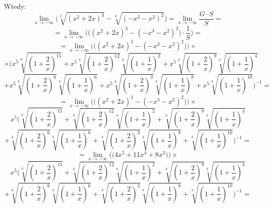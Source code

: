 \documentclass{article}
\begin{document}
Wtedy:
\begin{equation*}
    \lim_{x \to - \infty} \Big(\sqrt[6]{(x^2 + 2x)^{3}} - \sqrt[6]{(-x^3 - x^2)^{2}}\Big) = \lim_{x \to - \infty} \frac{G \cdot S}{S} =
\end{equation*}
\begin{equation*}
    = \lim_{x \to - \infty} \Bigg(\Big((x^2 + 2x)^{3} - (-x^3 - x^2)^{2}\Big) \cdot \frac{1}{S}\Bigg) =
\end{equation*}
\begin{equation*}
    = \lim_{x \to - \infty} \Bigg(\Big((x^2 + 2x)^{3} - (-x^3 - x^2)^{2}\Big)\Bigg) \times %
\end{equation*}
\begin{equation*}
    \times \Bigg(x^{5}\sqrt[6]{(1 + \frac{2}{x})^{15}} + x^{5}\sqrt[6]{(1 + \frac{2}{x})^{12}}\sqrt[6]{(1 + \frac{1}{x})^{2}}  + x^{5}\sqrt[6]{(1 + \frac{2}{x})^{9}}\sqrt[6]{(1 + \frac{1}{x})^{4}}
\end{equation*}
\begin{equation*}
    +  x^{5}\sqrt[6]{(1 + \frac{2}{x})^{6}}\sqrt[6]{(1 + \frac{1}{x})^{6}} + x^{5}\sqrt[6]{(1 + \frac{2}{x})^{3}}\sqrt[6]{(1 + \frac{1}{x})^{8}} + x^{5}\sqrt[6]{(1 + \frac{1}{x})^{10}}\Bigg)^{-1} = 
\end{equation*}
\begin{equation*}
    = \lim_{x \to - \infty} \Bigg(\Big((x^2 + 2x)^{3} - (-x^3 - x^2)^{2}\Big)\Bigg) \times %
\end{equation*}
\begin{equation*}
    x^{5}\Bigg(\sqrt[6]{(1 + \frac{2}{x})^{15}} + \sqrt[6]{(1 + \frac{2}{x})^{12}}\sqrt[6]{(1 + \frac{1}{x})^{2}}  + \sqrt[6]{(1 + \frac{2}{x})^{9}}\sqrt[6]{(1 + \frac{1}{x})^{4}}
\end{equation*}
\begin{equation*}
    +  \sqrt[6]{(1 + \frac{2}{x})^{6}}\sqrt[6]{(1 + \frac{1}{x})^{6}} + \sqrt[6]{(1 + \frac{2}{x})^{3}}\sqrt[6]{(1 + \frac{1}{x})^{8}} + \sqrt[6]{(1 + \frac{1}{x})^{10}}\Bigg)^{-1} = 
\end{equation*}
\begin{equation*}
    = \lim_{x \to - \infty} \Bigg(\Big(4x^5 + 11x^4 + 8x^3\Big)\Bigg) \times %
\end{equation*}
\begin{equation*}
    x^{5}\Bigg(\sqrt[6]{(1 + \frac{2}{x})^{15}} + \sqrt[6]{(1 + \frac{2}{x})^{12}}\sqrt[6]{(1 + \frac{1}{x})^{2}}  + \sqrt[6]{(1 + \frac{2}{x})^{9}}\sqrt[6]{(1 + \frac{1}{x})^{4}}
\end{equation*}
\begin{equation*}
    +  \sqrt[6]{(1 + \frac{2}{x})^{6}}\sqrt[6]{(1 + \frac{1}{x})^{6}} + \sqrt[6]{(1 + \frac{2}{x})^{3}}\sqrt[6]{(1 + \frac{1}{x})^{8}} + \sqrt[6]{(1 + \frac{1}{x})^{10}}\Bigg)^{-1} = 
\end{equation*}
\end{document}
